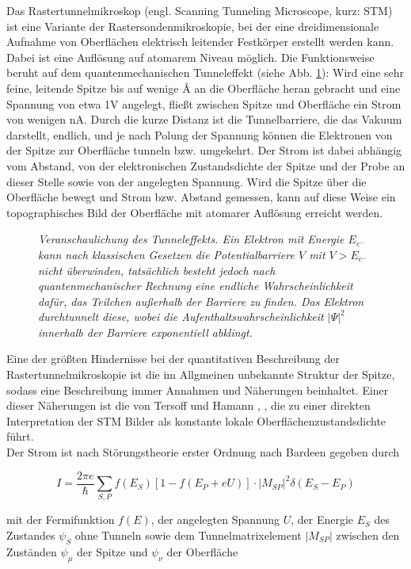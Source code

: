 Das Rastertunnelmikroskop (engl. Scanning Tunneling Microscope, kurz: STM) ist eine Variante der
Rastersondenmikroskopie, bei der eine dreidimensionale Aufnahme von Oberflächen elektrisch
leitender Festkörper erstellt werden kann. Dabei ist eine Auflösung auf atomarem Niveau möglich. Die
Funktionsweise beruht auf dem quantenmechanischen Tunneleffekt (siehe Abb. \ref{tunnel}): Wird eine
sehr feine, leitende Spitze bis auf wenige {\AA} an die Oberfläche heran gebracht und eine Spannung
von etwa 1V angelegt, fließt zwischen Spitze und Oberfläche ein Strom von wenigen nA. Durch
die kurze Distanz ist die Tunnelbarriere, die das Vakuum darstellt, endlich, und je nach Polung der Spannung können
die Elektronen von der Spitze zur Oberfläche tunneln bzw.
umgekehrt. Der Strom ist dabei abhängig vom Abstand, von der elektronischen Zustandsdichte der
Spitze und der Probe an dieser Stelle sowie von der angelegten Spannung. Wird die Spitze
über die Oberfläche bewegt und Strom bzw.
Abstand gemessen, kann auf diese Weise ein topographisches Bild der Oberfläche mit atomarer
Auflösung erreicht werden. 

\begin{figure}[H]
\centering
\sffamily 

\caption{\textit{Veranschaulichung des Tunneleffekts. Ein Elektron mit Energie $E_{e^-}$ kann nach
klassischen Gesetzen die Potentialbarriere $V$ mit $V>E_{e^-}$ nicht überwinden, tatsächlich besteht
jedoch nach quantenmechanischer Rechnung eine endliche Wahrscheinlichkeit dafür, das Teilchen
außerhalb der Barriere zu finden. Das Elektron durchtunnelt diese, wobei die
Aufenthaltswahrscheinlichkeit $|\Psi|^2$ innerhalb der Barriere exponentiell abklingt. }}
\label{tunnel}
\end{figure}


Eine der größten Hindernisse bei der quantitativen Beschreibung der Rastertunnelmikroskopie ist die
im Allgmeinen unbekannte Struktur der Spitze, sodass eine Beschreibung immer Annahmen und Näherungen
beinhaltet. Einer dieser Näherungen ist die von Tersoff und Hamann \cite{Ter83}, \cite{Ter85}, die
zu einer direkten Interpretation der STM Bilder als konstante lokale Oberflächenzustandsdichte führt.\\
Der Strom ist nach Störungstheorie erster Ordnung nach Bardeen \cite{Bar} gegeben durch

\[I=\frac{2\pi e}{\hbar}\sum_{S,P}
f(E_{S})[1-f(E_{P}+eU)]\cdot|M_{SP}|^2\delta(E_{S}-E_{P})\]

mit der Fermifunktion $f(E)$, der angelegten Spannung $U$, der Energie
$E_{S}$ des Zustandes $\psi_{S}$ ohne Tunneln sowie dem Tunnelmatrixelement $|M_{SP}|$
zwischen den Zuständen $\psi_{\mu}$ der Spitze und $\psi_{\nu}$ der Oberfläche

